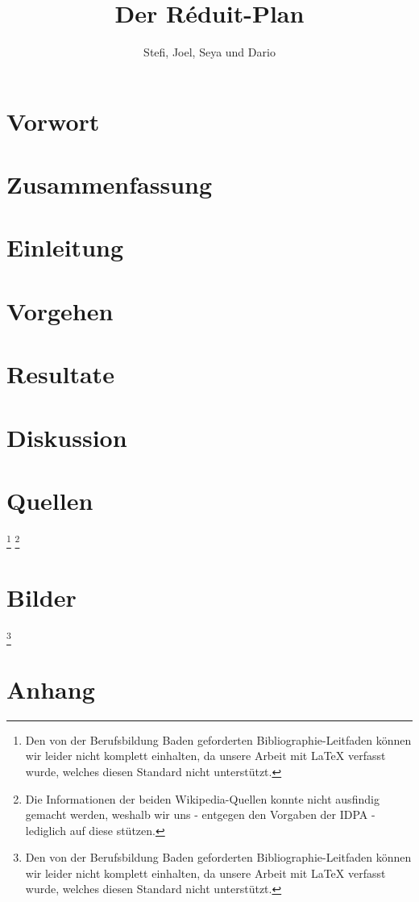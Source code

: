 \documentclass[opensans, a4paper]{article}
\title{Der Réduit-Plan}
\author{Stefi, Joel, Seya und Dario}
\begin{document}


\pagestyle{empty}
\tableofcontents
\clearpage
\pagestyle{plain}

\newpage

\section{Vorwort} \label{Vorwort}

\newpage 

\section{Zusammenfassung} \label{Zusammenfassung}

\newpage

\section{Einleitung} \label{Einleitung}

\newpage

\section{Vorgehen} \label{Vorgehen}

\newpage

\section{Resultate} \label{Resultate}

\newpage

\section{Diskussion} \label{Diskussion}

\newpage

\section{Quellen} \label{Quellen}
\nocite{*}
{ 
\footnote{Den von der Berufsbildung Baden geforderten Bibliographie-Leitfaden können wir leider nicht komplett einhalten, da unsere Arbeit mit LaTeX verfasst wurde, welches diesen Standard nicht unterstützt.}
\footnote{Die Informationen der beiden Wikipedia-Quellen konnte nicht ausfindig gemacht werden, weshalb wir uns - entgegen den Vorgaben der IDPA - lediglich auf diese stützen.}
\printbibliography 
}
\newpage

\section{Bilder} \label{Bilder}
\footnote{Den von der Berufsbildung Baden geforderten Bibliographie-Leitfaden können wir leider nicht komplett einhalten, da unsere Arbeit mit LaTeX verfasst wurde, welches diesen Standard nicht unterstützt.}
\listoffigures
\newpage

\section{Anhang} \label{Anhang}

\end{document}
